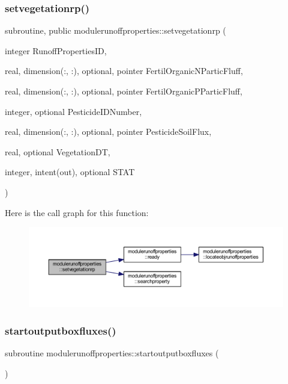 \subsubsection{\texorpdfstring{setvegetationrp()}{setvegetationrp()}}
{\footnotesize\ttfamily subroutine, public modulerunoffproperties\+::setvegetationrp (\begin{DoxyParamCaption}\item[{integer}]{Runoff\+Properties\+ID,  }\item[{real, dimension(\+:, \+:), optional, pointer}]{Fertil\+Organic\+N\+Partic\+Fluff,  }\item[{real, dimension(\+:, \+:), optional, pointer}]{Fertil\+Organic\+P\+Partic\+Fluff,  }\item[{integer, optional}]{Pesticide\+I\+D\+Number,  }\item[{real, dimension(\+:, \+:), optional, pointer}]{Pesticide\+Soil\+Flux,  }\item[{real, optional}]{Vegetation\+DT,  }\item[{integer, intent(out), optional}]{S\+T\+AT }\end{DoxyParamCaption})}

Here is the call graph for this function\+:\nopagebreak
\begin{figure}[H]
\begin{center}
\leavevmode
\includegraphics[width=350pt]{namespacemodulerunoffproperties_a63a750ecc17b3e0301717d8bc71858f2_cgraph}
\end{center}
\end{figure}
\mbox{\label{namespacemodulerunoffproperties_a06106b336b804481c4fd8b518bb683fe}} 
\subsubsection{\texorpdfstring{startoutputboxfluxes()}{startoutputboxfluxes()}}
{\footnotesize\ttfamily subroutine modulerunoffproperties\+::startoutputboxfluxes (\begin{DoxyParamCaption}{ }\end{DoxyParamCaption})\hspace{0.3cm}{\ttfamily [private]}}

